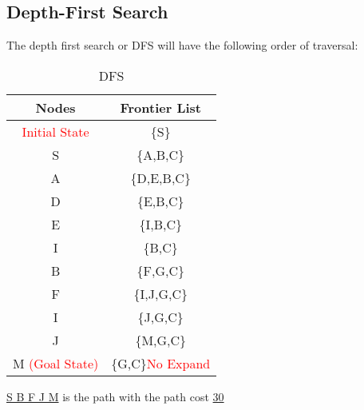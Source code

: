 \documentclass{article}
\begin{document}
	\subsection{Depth-First Search}
	The depth first search or DFS will have the following order of traversal:\\
    \vspace{-2pc}
	\begin{table}[H]
		\centering
		\caption{DFS}
		\label{tab:table1}
		\begin{tabular}{|c|c|}
			\toprule
			Nodes & Frontier List\\
			\midrule
			\textcolor{red}{Initial State} & \{S\}\\
    		\hline
    		S & \{A,B,C\}\\
    		\hline
    		A & \{D,E,B,C\}\\
    		\hline
    		D  & \{E,B,C\}\\
    		\hline
    		E  & \{I,B,C\}\\
    		\hline
    		I  & \{B,C\}\\
    		\hline
    		B  & \{F,G,C\}\\
    		\hline
    		F  & \{I,J,G,C\}\\
            \hline
            I  & \{J,G,C\}\\
    		\hline
    		J  & \{M,G,C\}\\
    		\hline
    		M \textcolor{red}{(Goal State)} & \{G,C\}\textcolor{red}{No Expand}\\
            \hline
    	\end{tabular}
	\end{table}
    \vspace{-.5pc}
    \underline{S B F J M} is the path with the path cost \underline{30}
\end{document}

